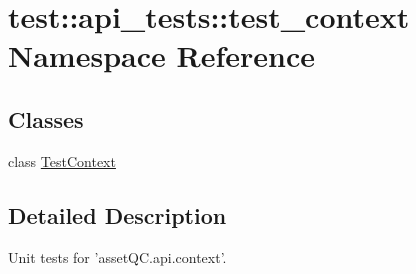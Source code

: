 \hypertarget{namespacetest_1_1api__tests_1_1test__context}{\section{test\-:\-:api\-\_\-tests\-:\-:test\-\_\-context \-Namespace \-Reference}
\label{d9/df0/namespacetest_1_1api__tests_1_1test__context}
}
\subsection*{\-Classes}
\begin{DoxyCompactItemize}
\item 
class \hyperlink{classtest_1_1api__tests_1_1test__context_1_1TestContext}{\-Test\-Context}
\end{DoxyCompactItemize}


\subsection{\-Detailed \-Description}
\begin{DoxyVerb}
Unit tests for 'assetQC.api.context'.
\end{DoxyVerb}
 